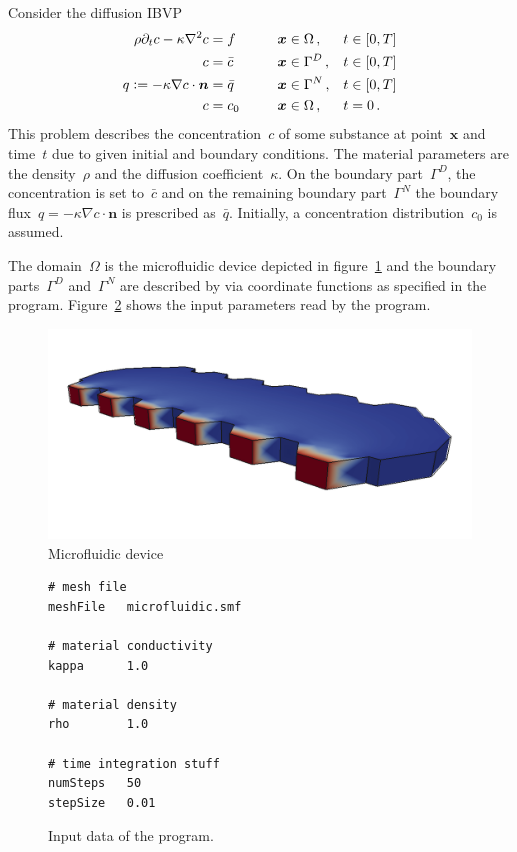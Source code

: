 \documentclass[a4paper,DIV=12,10pt]{scrartcl}
\newcommand{\vek}[1]{\boldsymbol{#1}}  %
\newcommand{\defeq}{\vcentcolon=} %
\newcommand{\x}[0]{\vek{x}}
\newcommand{\N}[0]{\vek{n}}
\begin{document}
Consider the diffusion IBVP
\begin{equation}
  \label{eq:diffusion}
  \begin{aligned}
    \rho \partial_t c - \kappa \nabla^2 c &= f  \qquad
    &\x &\in \Omega\,, &t &\in [0,T]\\
    c &= \bar{c}
    &\x &\in \Gamma^D\,, &t &\in [0,T]\\
    q \defeq -\kappa \nabla c \cdot \N &= \bar{q}
    &\x &\in \Gamma^N\,, &t &\in [0,T]\\
    c &= c_0
    &\x &\in \Omega\,, &t &= 0\,.
  \end{aligned}
\end{equation}
This problem describes the concentration~$c$ of some substance at
point~$\x$ and time~$t$ due to given initial and boundary conditions.
The material parameters are the density~$\rho$ and the diffusion
coefficient~$\kappa$. On the boundary part~$\Gamma^D$, the
concentration is set to~$\bar{c}$ and on the remaining boundary
part~$\Gamma^N$ the boundary flux~$q = - \kappa \nabla c \cdot \N$ is
prescribed as~$\bar{q}$. Initially, a concentration distribution~$c_0$
is assumed.

The domain~$\Omega$ is the microfluidic device depicted in
figure~\ref{fig:microfluidic} and the boundary parts~$\Gamma^D$
and~$\Gamma^N$ are described by via coordinate functions as specified
in the program. Figure~\ref{fig:inp1} shows the input parameters read
by the program.

\begin{figure}[htbp]
  \centering
  \includegraphics[width=.5\textwidth]{microfluidic}
  \caption{Microfluidic device}
  \label{fig:microfluidic}
\end{figure}

\begin{figure}[htbp]
  \centering
  \begin{verbatim}
# mesh file
meshFile   microfluidic.smf

# material conductivity
kappa      1.0

# material density
rho        1.0

# time integration stuff
numSteps   50
stepSize   0.01
  \end{verbatim}

  \caption{Input data of the program.}
  \label{fig:inp1}
\end{figure}
\end{document}
